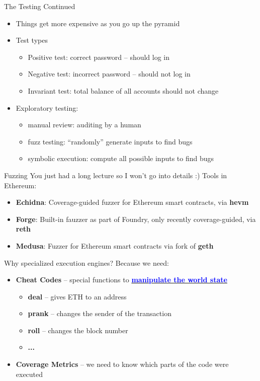 \documentclass[aspectratio=169]{beamer}
\newcommand{\bluelink}[2]{\href{#1}{\textcolor{blue}{\textbf{#2}}}}
\begin{document}
\begin{frame}{The Testing Continued}
\begin{itemize}
    \item Things get more expensive as you go up the pyramid
    \item Test types
    \begin{itemize}
        \item Positive test: correct password -- should log in
        \item Negative test: incorrect password -- should not log in
        \item Invariant test: total balance of all accounts should not change
    \end{itemize}
    \item Exploratory testing:
    \begin{itemize}
        \item manual review: auditing by a human
        \item fuzz testing: ``randomly'' generate inputs to find bugs
        \item symbolic execution: compute all possible inputs to find bugs
    \end{itemize}
\end{itemize}
\end{frame}

\begin{frame}{Fuzzing}
You just had a long lecture so I won't go into details :)
Tools in Ethereum:
\begin{itemize}
    \item \textbf{Echidna}: Coverage-guided fuzzer for Ethereum smart contracts, via \textbf{hevm}
    \item \textbf{Forge}: Built-in fauzzer as part of Foundry, only recently coverage-guided, via \textbf{reth}
    \item \textbf{Medusa}: Fuzzer for Ethereum smart contracts via fork of \textbf{geth}
\end{itemize}
\bigskip

Why specialized execution engines? Because we need:
\begin{itemize}
    \item \textbf{Cheat Codes} -- special functions to
        \bluelink{https://getfoundry.sh/reference/cheatcodes/environment}{manipulate the world state}
    \begin{itemize}
        \item \textbf{deal} -- gives ETH to an address
        \item \textbf{prank} -- changes the sender of the transaction
        \item \textbf{roll} -- changes the block number
        \item \textbf{...}
    \end{itemize}
    \item \textbf{Coverage Metrics} -- we need to know which parts of the code
        were executed
\end{itemize}
\end{frame}
\end{document}
